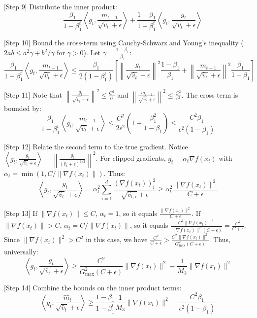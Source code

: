 \documentclass{article}
\begin{document}
[Step 9] Distribute the inner product:
$$ = \frac{\beta_1}{1-\beta_1^t} \left\langle g_t, \frac{m_{t-1}}{\sqrt{\hat{v}_t} + \epsilon} \right\rangle + \frac{1-\beta_1}{1-\beta_1^t} \left\langle g_t, \frac{g_t}{\sqrt{\hat{v}_t} + \epsilon} \right\rangle $$

[Step 10] Bound the cross-term using Cauchy-Schwarz and Young's inequality ($2ab \leq a^2 \gamma + b^2/\gamma$ for $\gamma > 0$). Let $\gamma = \frac{1-\beta_1}{\beta_1}$:
$$ \frac{\beta_1}{1-\beta_1^t} \left\langle g_t, \frac{m_{t-1}}{\sqrt{\hat{v}_t} + \epsilon} \right\rangle \leq \frac{\beta_1}{2(1-\beta_1^t)} \left[ \left\| \frac{g_t}{\sqrt{\hat{v}_t} + \epsilon} \right\|^2 \frac{1-\beta_1}{\beta_1} + \left\| \frac{m_{t-1}}{\sqrt{\hat{v}_t} + \epsilon} \right\|^2 \frac{\beta_1}{1-\beta_1} \right] $$

[Step 11] Note that $\left\| \frac{g_t}{\sqrt{\hat{v}_t} + \epsilon} \right\|^2 \leq \frac{C^2}{\epsilon^2}$ and $\left\| \frac{m_{t-1}}{\sqrt{\hat{v}_t} + \epsilon} \right\|^2 \leq \frac{C^2}{\epsilon^2}$. The cross term is bounded by:
$$ \frac{\beta_1}{1-\beta_1^t} \left\langle g_t, \frac{m_{t-1}}{\sqrt{\hat{v}_t} + \epsilon} \right\rangle \leq \frac{C^2}{2\epsilon^2} \left( 1 + \frac{\beta_1^2}{1-\beta_1} \right) \leq \frac{C^2 \beta_1}{\epsilon^2 (1-\beta_1)} $$

[Step 12] Relate the second term to the true gradient. Notice $\left\langle g_t, \frac{g_t}{\sqrt{\hat{v}_t} + \epsilon} \right\rangle = \left\| \frac{g_t}{(\hat{v}_t + \epsilon)^{1/2}} \right\|^2$. For clipped gradients, $g_t = \alpha_t \nabla f(x_t)$ with $\alpha_t = \min(1, C/\|\nabla f(x_t)\|)$. Thus:
$$ \left\langle g_t, \frac{g_t}{\sqrt{\hat{v}_t} + \epsilon} \right\rangle = \alpha_t^2 \sum_{i=1}^d \frac{(\nabla f(x_t))_i^2}{\sqrt{\hat{v}_{t,i}} + \epsilon} \geq \alpha_t^2 \frac{\|\nabla f(x_t)\|^2}{C + \epsilon} $$

[Step 13] If $\|\nabla f(x_t)\| \leq C$, $\alpha_t = 1$, so it equals $\frac{\|\nabla f(x_t)\|^2}{C+\epsilon}$. If $\|\nabla f(x_t)\| > C$, $\alpha_t = C/\|\nabla f(x_t)\|$, so it equals $\frac{C^2 \|\nabla f(x_t)\|^2}{\|\nabla f(x_t)\|^2(C+\epsilon)} = \frac{C^2}{C+\epsilon}$. Since $\|\nabla f(x_t)\|^2 > C^2$ in this case, we have $\frac{C^2}{C+\epsilon} > \frac{C^2 \|\nabla f(x_t)\|^2}{G_{\max}^2(C+\epsilon)}$. Thus, universally:
$$ \left\langle g_t, \frac{g_t}{\sqrt{\hat{v}_t} + \epsilon} \right\rangle \geq \frac{C^2}{G_{\max}^2(C+\epsilon)} \|\nabla f(x_t)\|^2 \equiv \frac{1}{M_3} \|\nabla f(x_t)\|^2 $$

[Step 14] Combine the bounds on the inner product terms:
$$ \left\langle g_t, \frac{\hat{m}_t}{\sqrt{\hat{v}_t} + \epsilon} \right\rangle \geq \frac{1-\beta_1}{1-\beta_1^t} \frac{1}{M_3} \|\nabla f(x_t)\|^2 - \frac{C^2 \beta_1}{\epsilon^2 (1-\beta_1)} $$
\end{document}
